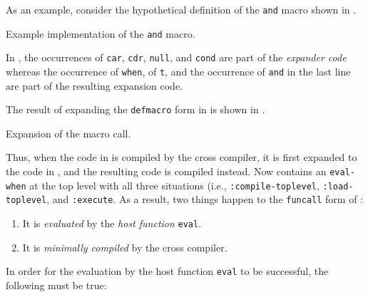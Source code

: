 As an example, consider the hypothetical definition of the
\texttt{and} macro shown in .

\begin{codefragment}
\caption{\label{code-defmacro-and}
Example implementation of the \texttt{and} macro.}
\end{codefragment}

In , the occurrences of \texttt{car},
\texttt{cdr}, \texttt{null}, and \texttt{cond} are part of the
\emph{expander code} whereas the occurrence of \texttt{when}, of
\texttt{t}, and the occurrence of \texttt{and} in the last line are
part of the resulting expansion code. 

The result of expanding the \texttt{defmacro} form in
 is shown in
. 

\begin{codefragment}
\caption{\label{code-macro-expansion-and}
Expansion of the macro call.}
\end{codefragment}

Thus, when the code in  is compiled by the
cross compiler, it is first expanded to the code in
, and the resulting code is compiled
instead.  Now  contains an
\texttt{eval-when} at the top level with all three situations (i.e.,
\texttt{:compile-toplevel}, \texttt{:load-toplevel}, and
\texttt{:execute}.  As a result, two things happen to the
\texttt{funcall} form of :

\begin{enumerate}
\item It is \emph{evaluated} by the \emph{host function}
  \texttt{eval}.
\item It is \emph{minimally compiled} by the cross compiler.
\end{enumerate}

In order for the evaluation by the host function \texttt{eval} to be
successful, the following must be true:

